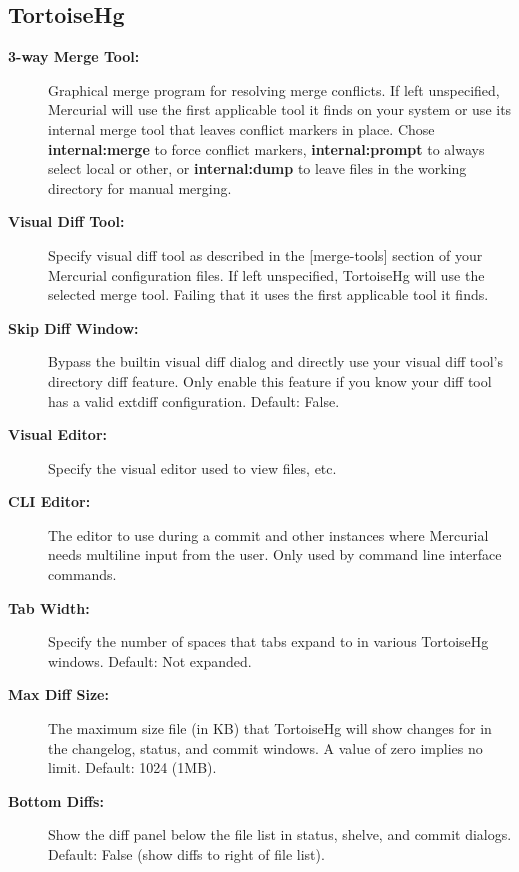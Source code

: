 \documentclass[letterpaper,10pt,english]{manual}
\begin{document}
\subsection{TortoiseHg}
\begin{description}
\item[\textbf{3-way Merge Tool:}]
Graphical merge program for resolving merge conflicts.  If left
unspecified, Mercurial will use the first applicable tool it finds
on your system or use its internal merge tool that leaves conflict
markers in place.  Chose \textbf{internal:merge} to force
conflict markers, \textbf{internal:prompt} to always select local
or other, or \textbf{internal:dump} to leave files in the working
directory for manual merging.

\item[\textbf{Visual Diff Tool:}]
Specify visual diff tool as described in the {[}merge-tools{]} section
of your Mercurial configuration files.  If left unspecified,
TortoiseHg will use the selected merge tool. Failing that it uses
the first applicable tool it finds.

\item[\textbf{Skip Diff Window:}]
Bypass the builtin visual diff dialog and directly use your
visual diff tool's directory diff feature.  Only enable this
feature if you know your diff tool has a valid extdiff
configuration.  Default: False.

\item[\textbf{Visual Editor:}]
Specify the visual editor used to view files, etc.

\item[\textbf{CLI Editor:}]
The editor to use during a commit and other
instances where Mercurial needs multiline input from
the user.  Only used by command line interface commands.

\item[\textbf{Tab Width:}]
Specify the number of spaces that tabs expand to in various
TortoiseHg windows. Default: Not expanded.

\item[\textbf{Max Diff Size:}]
The maximum size file (in KB) that TortoiseHg will
show changes for in the changelog, status, and commit windows.
A value of zero implies no limit.  Default: 1024 (1MB).

\item[\textbf{Bottom Diffs:}]
Show the diff panel below the file list in status, shelve, and
commit dialogs.  Default: False (show diffs to right of file list).


\end{description}
\end{document}
